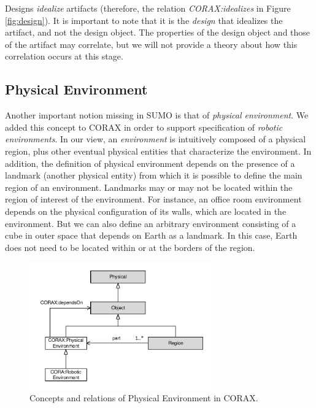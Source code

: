 \documentclass[preprint,12pt]{elsarticle}
\newcommand{\hlc}[2][yellow]{ {\sethlcolor{#1} \hl{#2}} }
\newcommand{\joel}[1]{{\hlc[green]{\textbf{Joel}: #1}}}
\begin{document}
Designs \emph{idealize} artifacts (therefore, the relation \emph{CORAX:idealizes} in Figure \ref{fig:design}). It is important to note that it is the \emph{design} that idealizes the artifact, and not the design object. The properties of the design object and those of the artifact may correlate, but we will not provide a theory about how this correlation occurs at this stage.

\subsection{Physical Environment}

Another important notion missing in SUMO is that of \emph{physical environment}. We added this concept to CORAX in order to support specification of \emph{robotic environments}. In our view, an \emph{environment} is intuitively composed of a physical region, plus other eventual physical entities that characterize the environment. In addition, the definition of physical environment depends on the presence of a landmark (another physical entity) from which it is possible to define the main region of an environment. Landmarks may or may not be located within the region of interest of the environment. For instance, an office room environment depends on the physical configuration of its walls, which are located in the environment. But we can also define an arbitrary environment consisting of a cube in outer space that depends on Earth as a landmark. In this case, Earth does not need to be located within or at the borders of the region.


\begin{figure}[h]
    \centering
    \includegraphics[width=0.7\textwidth]{figs/physicalenv}
    \caption{Concepts and relations of Physical Environment in CORAX.}
\end{figure}
\end{document}
